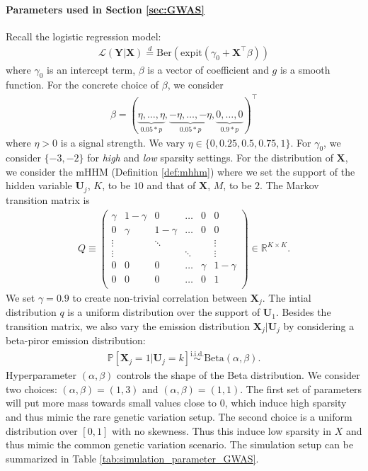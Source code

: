 \documentclass[12pt]{article}
\theoremstyle{definition}
\def\P{\mathbb{P}}
\def\P{\mathbb{P}}
\renewcommand{\P}{\mathbb{P}}							%
\newcommand{\expit}{\mathrm{expit}}                 	%
\newcommand{\prx}{\bm X}								%
\newcommand{\pry}{{\bm Y}}								%
\newcommand{\pru}{{\bm U}}								%
\newcommand{\law}{\mathcal L}							%
\begin{document}
\paragraph{Parameters used in Section \ref{sec:GWAS}}
Recall the logistic regression model:
\begin{align*}
	\law(\pry|\prx)\overset{d}{=}\text{Ber}(\expit(\gamma_0 + \prx^\top \beta))
\end{align*}
where $\gamma_0$ is an intercept term, $\beta$ is a vector of coefficient and $g$ is a smooth function. For the concrete choice of $\beta$, we consider 
\begin{align*}
	\beta = (\underbrace{\eta,\ldots,\eta}_{0.05 * p},\underbrace{-\eta,\ldots,-\eta}_{0.05 * p},\underbrace{0,\ldots,0}_{0.9 * p})^\top
\end{align*}
where $\eta>0$ is a signal strength. We vary $\eta\in\{0, 0.25, 0.5, 0.75, 1\}$. For $\gamma_0$, we consider $\{-3,-2\}$ for \textit{high} and \textit{low} sparsity settings. For the distribution of $\prx$, we consider the mHHM (Definition \ref{def:mhhm}) where we set the support of the hidden variable $\pru_j$, $K$, to be $10$ and that of $\prx$, $M$, to be $2$. The Markov transition matrix is 
\begin{align*}
	Q\equiv 
	\begin{pmatrix}
		\gamma & 1-\gamma & 0 & \ldots & 0 & 0\\
		0 & \gamma & 1-\gamma & \ldots & 0 & 0\\
		\vdots & &  \ddots & & &\vdots\\
		\vdots & &  & \ddots & &\vdots\\
		0 & 0 & 0 & \ldots & \gamma & 1 - \gamma\\
		0 & 0 & 0 & \ldots & 0 & 1\\
	\end{pmatrix}
	\in\mathbb{R}^{K\times K}.
\end{align*}
We set $\gamma=0.9$ to create non-trivial correlation between $\prx_j$. The intial distribution $q$ is a uniform distribution over the support of $\pru_1$. Besides the transition matrix, we also vary the emission distribution $\prx_j|\pru_j$ by considering a beta-piror emission distribution:
\begin{align}\label{eq:beta_emission}
  \P[\prx_j=1|\pru_j=k]\overset{\mathrm{i.i.d.}}{\sim} \mathrm{Beta}(\alpha,\beta).
  \tag{beta-emission}
\end{align}
Hyperparameter $(\alpha,\beta)$ controls the shape of the Beta distribution. We consider two choices: $(\alpha,\beta)=(1,3)$ and $(\alpha,\beta)=(1,1)$. The first set of parameters will put more mass towards small values close to $0$, which induce high sparsity and thus mimic the rare genetic variation setup. The second choice is a uniform distribution over $[0,1]$ with no skewness. Thus this induce low sparsity in $X$ and thus mimic the common genetic variation scenario. The simulation setup can be summarized in Table \ref{tab:simulation_parameter_GWAS}.
\end{document}
